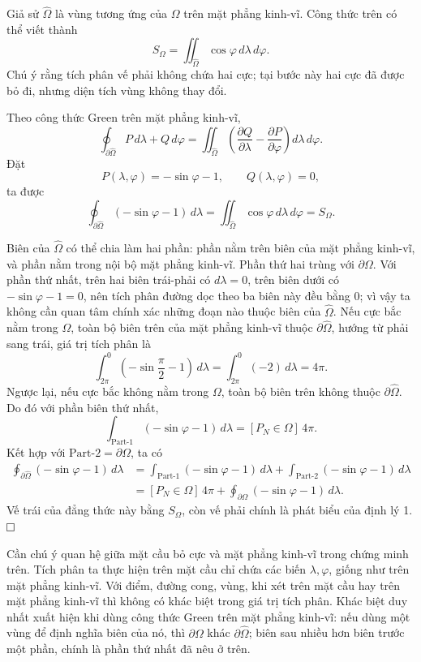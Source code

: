 \documentclass[11pt]{article}
\newcommand{\proofbox}{\ensuremath{\vcenter{\hrule height 0.45pt
  \hbox{\vrule width 0.45pt height 6pt\kern 6pt\vrule width 0.45pt}
  \hrule height 0.45pt}}}
\begin{document}
Giả sử \(\widehat{\Omega}\) là vùng tương ứng của \(\Omega\) trên mặt phẳng
kinh-vĩ. Công thức trên có thể viết thành
\[
  S_{\Omega}=\iint_{\widehat{\Omega}}
  \cos\varphi\,d\lambda\,d\varphi.
\]
Chú ý rằng tích phân vế phải không chứa hai cực; tại bước này hai cực đã được
bỏ đi, nhưng diện tích vùng không thay đổi.

Theo công thức Green trên mặt phẳng kinh-vĩ,
\[
  \oint_{\partial\widehat{\Omega}}P\,d\lambda+Q\,d\varphi
  =
  \iint_{\widehat{\Omega}}
  \left(\frac{\partial Q}{\partial\lambda}
  -\frac{\partial P}{\partial\varphi}\right)
  d\lambda\,d\varphi.
\]
Đặt
\[
  P(\lambda,\varphi)=-\sin\varphi-1,\qquad Q(\lambda,\varphi)=0,
\]
ta được
\[
  \oint_{\partial\widehat{\Omega}}(-\sin\varphi-1)\,d\lambda
  =
  \iint_{\widehat{\Omega}}\cos\varphi\,d\lambda\,d\varphi
  =
  S_{\Omega}.
\]

Biên của \(\widehat{\Omega}\) có thể chia làm hai phần: phần nằm trên biên của
mặt phẳng kinh-vĩ, và phần nằm trong nội bộ mặt phẳng kinh-vĩ. Phần thứ hai
trùng với \(\partial\Omega\). Với phần thứ nhất, trên hai biên trái-phải có
\(d\lambda=0\), trên biên dưới có \(-\sin\varphi-1=0\), nên tích phân đường
dọc theo ba biên này đều bằng \(0\); vì vậy ta không cần quan tâm chính xác
những đoạn nào thuộc biên của \(\widehat{\Omega}\). Nếu cực bắc nằm trong
\(\Omega\), toàn bộ biên trên của mặt phẳng kinh-vĩ thuộc
\(\partial\widehat{\Omega}\), hướng từ phải sang trái, giá trị tích phân là
\[
  \int_{2\pi}^{0}\left(-\sin\frac{\pi}{2}-1\right)\,d\lambda
  =
  \int_{2\pi}^{0}(-2)\,d\lambda
  =4\pi.
\]
Ngược lại, nếu cực bắc không nằm trong \(\Omega\), toàn bộ biên trên không
thuộc \(\partial\widehat{\Omega}\). Do đó với phần biên thứ nhất,
\[
  \int_{\text{Part-1}}(-\sin\varphi-1)\,d\lambda
  =[P_N\in\Omega]\,4\pi.
\]
Kết hợp với \(\text{Part-2}=\partial\Omega\), ta có
\[
\begin{aligned}
  \oint_{\partial\widehat{\Omega}}(-\sin\varphi-1)\,d\lambda
  &=
  \int_{\text{Part-1}}(-\sin\varphi-1)\,d\lambda
  +\int_{\text{Part-2}}(-\sin\varphi-1)\,d\lambda\\
  &=[P_N\in\Omega]\,4\pi
  +\oint_{\partial\Omega}(-\sin\varphi-1)\,d\lambda.
\end{aligned}
\]
Vế trái của đẳng thức này bằng \(S_{\Omega}\), còn vế phải chính là phát biểu
của định lý 1. \(\proofbox\)

Cần chú ý quan hệ giữa mặt cầu bỏ cực và mặt phẳng kinh-vĩ trong chứng minh
trên. Tích phân ta thực hiện trên mặt cầu chỉ chứa các biến
\(\lambda,\varphi\), giống như trên mặt phẳng kinh-vĩ. Với điểm, đường cong,
vùng, khi xét trên mặt cầu hay trên mặt phẳng kinh-vĩ thì không có khác biệt
trong giá trị tích phân. Khác biệt duy nhất xuất hiện khi dùng công thức Green
trên mặt phẳng kinh-vĩ: nếu dùng một vùng để định nghĩa biên của nó, thì
\(\partial\Omega\) khác \(\partial\widehat{\Omega}\); biên sau nhiều hơn biên
trước một phần, chính là phần thứ nhất đã nêu ở trên.
\end{document}
